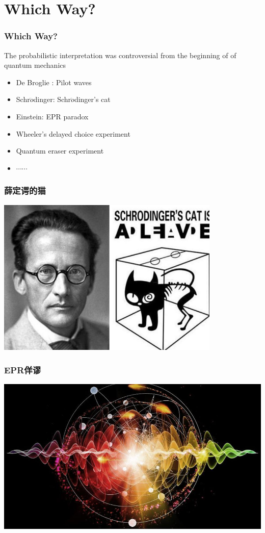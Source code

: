 \section{Which Way?}

\begin{frame}
    \frametitle{Which Way?}
    The probabilistic interpretation was controversial from the beginning of of quantum mechanics
    \begin{itemize}
        \item De Broglie : Pilot waves
        \item Schr$\ddot{o}$dinger: Schr$\ddot{o}$dinger's cat
        \item Einstein: EPR paradox
        \item Wheeler's delayed choice experiment
        \item Quantum eraser experiment
        \item $\cdots \cdots$
    \end{itemize}
\end{frame}

\begin{frame}
    \frametitle{薛定谔的猫}
    \begin{center}
        \includegraphics[width=0.8\textwidth]{figs/cat.jpeg} \\
    \end{center} 
\end{frame}

\begin{frame}
    \frametitle{EPR佯谬}
    \begin{center}
        \includegraphics[width=1.0\textwidth]{figs/EPR.jpeg} \\
    \end{center} 
\end{frame}

